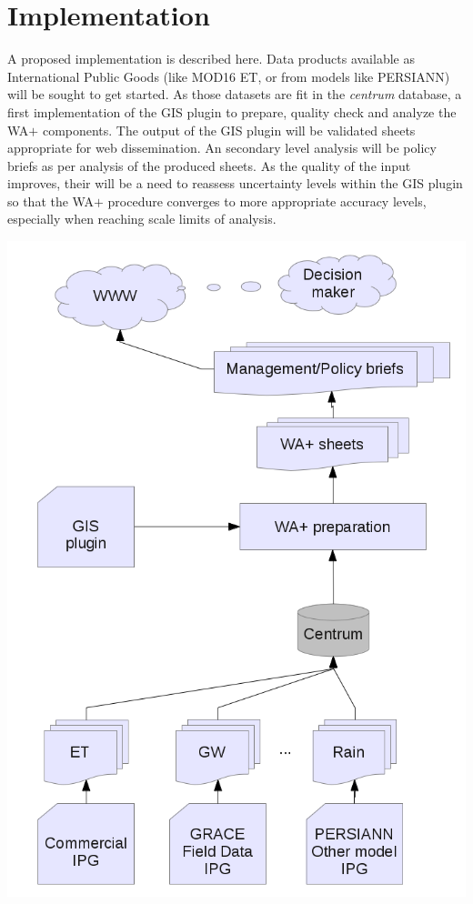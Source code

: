 \documentclass[a4paper,10pt,onecolumn]{article}
\begin{document}
\section{Implementation}
A proposed implementation is described here. Data products available as International Public Goods (like MOD16 ET, 
or from models like PERSIANN) will be sought to get started. As those datasets are fit in the {\it centrum} database,
a first implementation of the GIS plugin to prepare, quality check and analyze the WA$+$ components. The output of the
GIS plugin will be validated sheets appropriate for web dissemination. An secondary level analysis will be policy briefs
as per analysis of the produced sheets.
\newline
As the quality of the input improves, their will be a need to reassess uncertainty levels within the GIS plugin so that 
the WA$+$ procedure converges to more appropriate accuracy levels, especially when reaching scale limits of analysis.
\begin{center}
 \includegraphics[scale=0.8,keepaspectratio=true]{./20130426_WAp_arch.png}
\end{center}
\end{document}
